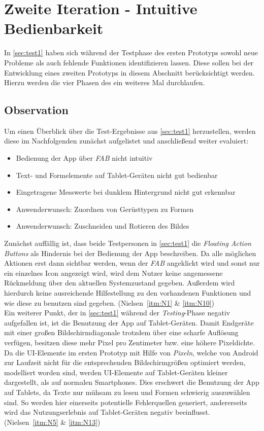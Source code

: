 \chapter{Zweite Iteration - Intuitive Bedienbarkeit}\label{chap:pro2}
In \autoref{sec:test1} haben sich während der Testphase des ersten Prototyps sowohl neue Probleme als auch fehlende Funktionen identifizieren lassen.
Diese sollen bei der Entwicklung eines zweiten Prototyps in diesem Abschnitt berücksichtigt werden. 
Hierzu werden die vier Phasen des \hcdp{} ein weiteres Mal durchlaufen.

\section{Observation}
Um einen Überblick über die Test-Ergebnisse aus \autoref{sec:test1} herzustellen, werden diese im Nachfolgenden zunächst aufgelistet und anschließend weiter evaluiert:

\begin{itemize}
  \item Bedienung der App über \emph{FAB} nicht intuitiv
  \item Text- und Formelemente auf Tablet-Geräten nicht gut bedienbar
  \item Eingetragene Messwerte bei dunklem Hintergrund nicht gut erkennbar
  \item Anwenderwunsch: Zuordnen von Gerüsttypen zu Formen
  \item Anwenderwunsch: Zuschneiden und Rotieren des Bildes
\end{itemize}

\noindent
Zunächst auffällig ist, dass beide Testpersonen in \autoref{sec:test1} die \emph{Floating Action Buttons} als Hindernis bei der Bedienung der App beschreiben.
Da alle möglichen Aktionen erst dann sichtbar werden, wenn der \emph{FAB} angeklickt wird und sonst nur ein einzelnes Icon angezeigt wird, wird dem Nutzer keine angemessene Rückmeldung über den aktuellen Systemzustand gegeben.
Außerdem wird hierdurch keine ausreichende Hilfestellung zu den vorhandenen Funktionen und wie diese zu benutzen sind gegeben.
(Nielsen~\autoref{itm:N1} \& \autoref{itm:N10}) \\

Ein weiterer Punkt, der in \autoref{sec:test1} während der \emph{Testing}-Phase negativ aufgefallen ist, ist die Benutzung der App auf Tablet-Geräten.
Damit Endgeräte mit einer großen Bildschirmdiagonale trotzdem über eine scharfe Auflösung verfügen, besitzen diese mehr Pixel pro Zentimeter bzw. eine höhere Pixeldichte.
Da die UI-Elemente im ersten Prototyp mit Hilfe von \emph{Pixeln}, welche von Android zur Laufzeit nicht für die entsprechenden Bildschirmgrößen optimiert werden, modelliert worden sind, werden UI-Elemente auf Tablet-Geräten kleiner dargestellt, als auf normalen Smartphones.
Dies erschwert die Benutzung der App auf Tablets, da Texte nur mühsam zu lesen und Formen schwierig auszuwählen sind.
So werden hier einerseits potentielle Fehlerquellen generiert, andererseits wird das Nutzungserlebnis auf Tablet-Geräten negativ beeinflusst.
(Nielsen~\autoref{itm:N5} \& \autoref{itm:N13}) \\

